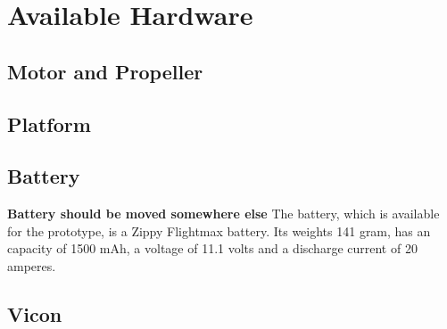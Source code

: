 \section{Available Hardware}

\subsection{Motor and Propeller}

\subsection{Platform}

\subsection{Battery}

\textbf{Battery should be moved somewhere else}
The battery, which is available for the prototype, is a Zippy Flightmax battery. Its weights 141 gram, has an capacity of 1500 mAh, a voltage of 11.1 volts and a discharge current of 20 amperes. 

\subsection{Vicon}


